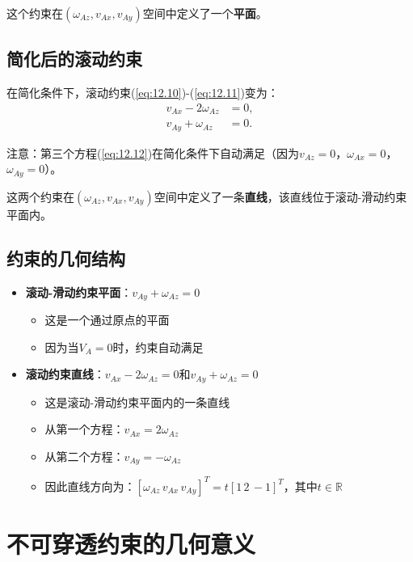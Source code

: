 \documentclass[12pt,a4paper]{article}
\begin{document}
这个约束在$(\omega_{Az}, v_{Ax}, v_{Ay})$空间中定义了一个\textbf{平面}。

\subsection{简化后的滚动约束}

在简化条件下，滚动约束(\ref{eq:12.10})-(\ref{eq:12.11})变为：
\begin{align}
v_{Ax} - 2\omega_{Az} &= 0, \label{eq:simplified_rolling1} \\
v_{Ay} + \omega_{Az} &= 0. \label{eq:simplified_rolling2}
\end{align}

注意：第三个方程(\ref{eq:12.12})在简化条件下自动满足（因为$v_{Az} = 0$，$\omega_{Ax} = 0$，$\omega_{Ay} = 0$）。

这两个约束在$(\omega_{Az}, v_{Ax}, v_{Ay})$空间中定义了一条\textbf{直线}，该直线位于滚动-滑动约束平面内。

\subsection{约束的几何结构}

\begin{itemize}
\item \textbf{滚动-滑动约束平面}：$v_{Ay} + \omega_{Az} = 0$
  \begin{itemize}
  \item 这是一个通过原点的平面
  \item 因为当$V_A = 0$时，约束自动满足
  \end{itemize}

\item \textbf{滚动约束直线}：$v_{Ax} - 2\omega_{Az} = 0$和$v_{Ay} + \omega_{Az} = 0$
  \begin{itemize}
  \item 这是滚动-滑动约束平面内的一条直线
  \item 从第一个方程：$v_{Ax} = 2\omega_{Az}$
  \item 从第二个方程：$v_{Ay} = -\omega_{Az}$
  \item 因此直线方向为：$[\omega_{Az} \, v_{Ax} \, v_{Ay}]^T = t[1 \, 2 \, -1]^T$，其中$t \in \mathbb{R}$
  \end{itemize}
\end{itemize}

\section{不可穿透约束的几何意义}
\end{document}
